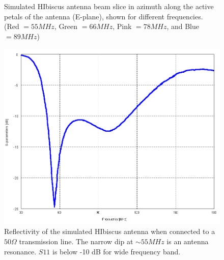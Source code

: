 \begin{figure}[htb]
\begin{minipage}[b]{0.47\textwidth}
\caption{Simulated HIbiscus antenna beam slice in azimuth along the active petals of the antenna (E-plane), shown for different frequencies. (Red $=55 MHz$, Green $= 66 MHz$, Pink $=78 MHz$, and Blue $=89 MHz$)}
\label{Fig:HIsym_beam_2}
\end{minipage}
\end{figure}
 
\begin{figure}[htb]
\centering
\begin{minipage}[b]{0.49\textwidth}
\centering
\includegraphics[width=0.95\linewidth]{SCIHI_system/figures/HIbiscus_S11_50_Cart.png}
\caption{Reflectivity of the simulated HIbiscus antenna when connected to a $50 \Omega$ transmission line. The narrow dip at $\sim 55 MHz$ is an antenna resonance. $S11$ is below -10 dB for wide frequency band.}
\label{Fig:HIsim_S11_dB}
\end{minipage}%
\begin{minipage}[b]{0.02\textwidth}
\hspace{1cm}
\end{minipage}%
\begin{minipage}[b]{0.46\textwidth}
\centering

\end{minipage}
\end{figure}
